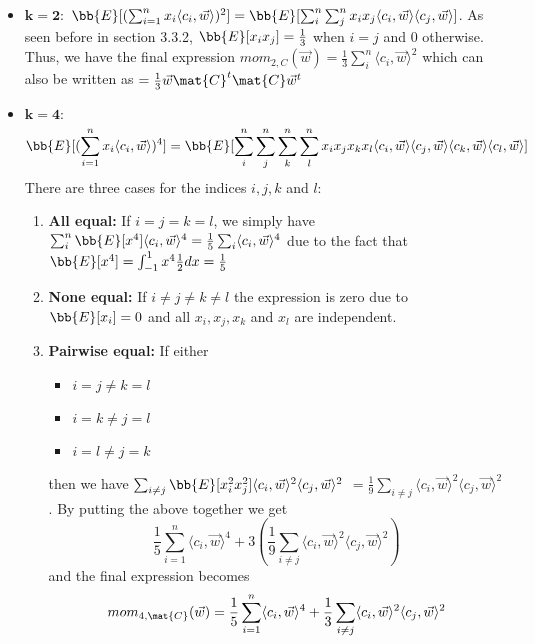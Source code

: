 \begin{itemize}
    \item $\mathbf{k = 2: }$
        $\bb{E}[(\sum_{i=1}^{n} x_i \langle c_i, \vec{w} \rangle ) ^2] = \bb{E}[\sum_{i}^{n} \sum_{j}^{n} x_i x_j \langle c_i, \vec{w} \rangle \langle c_j, \vec{w} \rangle]$.
        As seen before in section 3.3.2, $\bb{E}[x_i x_j] = \frac{1}{3}$ when $i = j$ and $0$ otherwise. Thus, we have the final expression 
        $mom_{2, C}(\vec{w}) = \frac{1}{3} \sum_{i}^{n} \langle c_i, \vec{w} \rangle ^2$ which can also be written as
        $ = \frac{1}{3} \vec{w} \mat{C}^t \mat{C} \vec{w}^t$
    \item $\mathbf{k = 4: }$
        \[ \bb{E}[(\sum_{i=1}^{n} x_i \langle c_i, \vec{w} \rangle ) ^4] = 
        \bb{E}[\sum_{i}^{n} \sum_{j}^{n} \sum_{k}^{n} \sum_{l}^{n} x_i x_j x_k x_l 
        \langle c_i, \vec{w} \rangle \langle c_j, \vec{w} \rangle
    \langle c_k, \vec{w} \rangle \langle c_l, \vec{w} \rangle] \]
    There are three cases for the indices $i, j, k$ and $l$:
    \begin{enumerate}
        \item \textbf{All equal: } If $i = j = k = l$, we simply have $\sum_i^n \bb{E}[x^4] \langle c_i, \vec{w} \rangle ^4 = \frac{1}{5} \sum_i \langle c_i, \vec{w} \rangle ^4$
            due to the fact that $\bb{E}[x ^4] = \int_{-1}^{1} x^4 \frac{1}{2} dx = \frac{1}{5}$
        \item \textbf{None equal:} If $i \neq j \neq k \neq l$ the expression is zero due to $\bb{E}[x_i] = 0$ and all $x_i, x_j, x_k$ and $x_l$ are independent.
        \item \textbf{Pairwise equal:} If either 
            \begin{itemize}
                \item $i = j \neq k = l$
                \item $i = k \neq j = l$ 
                \item $i = l \neq j = k$
            \end{itemize}
            then we have 
            $\sum_{i \neq j} \bb{E}[x_i ^2 x_j^2] \langle c_i, \vec{w} \rangle ^2 \langle c_j, \vec{w} \rangle^2$ 
            $ = \frac{1}{9} \sum_{i \neq j} \langle c_i, \vec{w} \rangle^2 \langle c_j, \vec{w} \rangle^2$. By putting the above together we get
            \[\frac{1}{5} \sum_{i=1}^{n} \langle c_i, \vec{w} \rangle ^4 + 3(\frac{1}{9} \sum_{i \neq j} \langle c_i, \vec{w} \rangle ^2 \langle c_j, \vec{w} \rangle ^2)\]
            and the final expression becomes 
            \[ mom_{4, \mat{C}} (\vec{w}) = \frac{1}{5} \sum_{i=1}^{n} \langle c_i, \vec{w} \rangle ^4 + \frac{1}{3} \sum_{i \neq j} \langle c_i, \vec{w} \rangle ^2 \langle c_j, \vec{w} \rangle ^2\]
    \end{enumerate}


\end{itemize}
